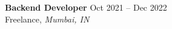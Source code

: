 \begin{center}
    \begin{raggedright}
        \normalsize
        \textbf{Backend Developer}
        \hfill
        {Oct 2021 -- Dec 2022} \\
        \small{Freelance}, \textit{Mumbai, IN}\\
        \normalsize
    \end{raggedright}
    
\vspace{-12pt}
\end{center}